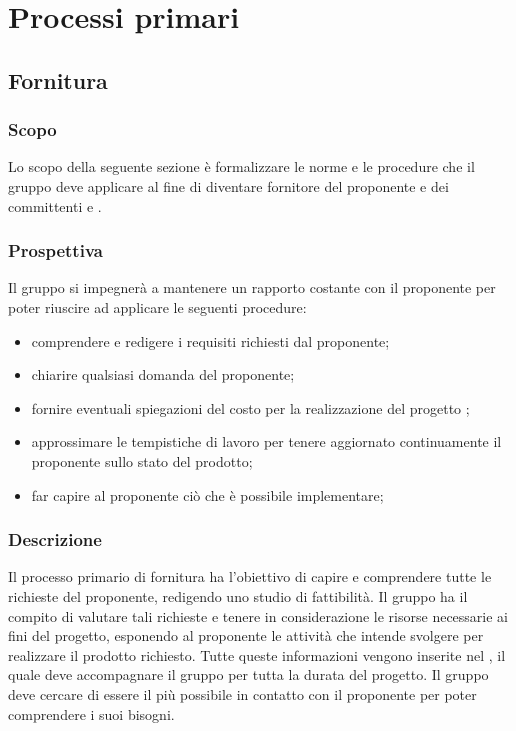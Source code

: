 \section{Processi primari}
\subsection{Fornitura}
\subsubsection{Scopo}
Lo scopo della seguente sezione è formalizzare le norme e le procedure che il gruppo \Gruppo{} deve applicare al fine di diventare fornitore del proponente \Proponente{} e dei committenti \VT{} e \CR{}.

\subsubsection{Prospettiva}
Il gruppo si impegnerà a mantenere un rapporto costante con il proponente per poter riuscire ad applicare le seguenti procedure:
\begin{itemize}
	\item comprendere e redigere i requisiti richiesti dal proponente;
	\item chiarire qualsiasi domanda del proponente;
	\item fornire eventuali spiegazioni del costo per la realizzazione del progetto \NomeProgetto{};
	\item approssimare le tempistiche di lavoro per tenere aggiornato continuamente il proponente sullo stato del prodotto; 
	\item far capire al proponente ciò che è possibile implementare;
\end{itemize}

\subsubsection{Descrizione} 
Il processo primario di fornitura ha l'obiettivo di capire e comprendere tutte le richieste del proponente, redigendo uno studio di fattibilità. 
Il gruppo \Gruppo{} ha il compito di valutare tali richieste e tenere in considerazione le risorse necessarie ai fini del progetto, esponendo al proponente \Proponente{} le attività che intende svolgere per realizzare il prodotto richiesto.
Tutte queste informazioni vengono inserite nel \PdP{}, il quale deve accompagnare il gruppo per tutta la durata del progetto.
Il gruppo \Gruppo{} deve cercare di essere il più possibile in contatto con il proponente per poter comprendere i suoi bisogni.

